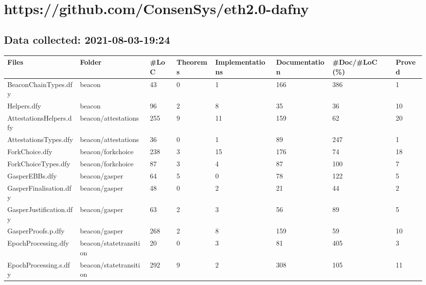 \documentclass[a4paper, 12pt]{article}
\begin{document}
\section*{https://github.com/ConsenSys/eth2.0-dafny}
\subsection*{Data collected: 2021-08-03-19:24}
\scriptsize
\begin{tabular}{llllllll}
\toprule
                   Files &                  Folder &  \#LoC & Theorems & Implementations & Documentation & \#Doc/\#LoC (\%) & Proved \\
\midrule
    BeaconChainTypes.dfy &                  beacon &    43 &        0 &               1 &           166 &           386 &      1 \\
             Helpers.dfy &                  beacon &    96 &        2 &               8 &            35 &            36 &     10 \\
 AttestationsHelpers.dfy &     beacon/attestations &   255 &        9 &              11 &           159 &            62 &     20 \\
   AttestationsTypes.dfy &     beacon/attestations &    36 &        0 &               1 &            89 &           247 &      1 \\
          ForkChoice.dfy &       beacon/forkchoice &   238 &        3 &              15 &           176 &            74 &     18 \\
     ForkChoiceTypes.dfy &       beacon/forkchoice &    87 &        3 &               4 &            87 &           100 &      7 \\
          GasperEBBs.dfy &           beacon/gasper &    64 &        5 &               0 &            78 &           122 &      5 \\
  GasperFinalisation.dfy &           beacon/gasper &    48 &        0 &               2 &            21 &            44 &      2 \\
 GasperJustification.dfy &           beacon/gasper &    63 &        2 &               3 &            56 &            89 &      5 \\
      GasperProofs.p.dfy &           beacon/gasper &   268 &        2 &               8 &           159 &            59 &     10 \\
     EpochProcessing.dfy &  beacon/statetransition &    20 &        0 &               3 &            81 &           405 &      3 \\
   EpochProcessing.s.dfy &  beacon/statetransition &   292 &        9 &               2 &           308 &           105 &     11 \\

\end{tabular}
\end{document}

